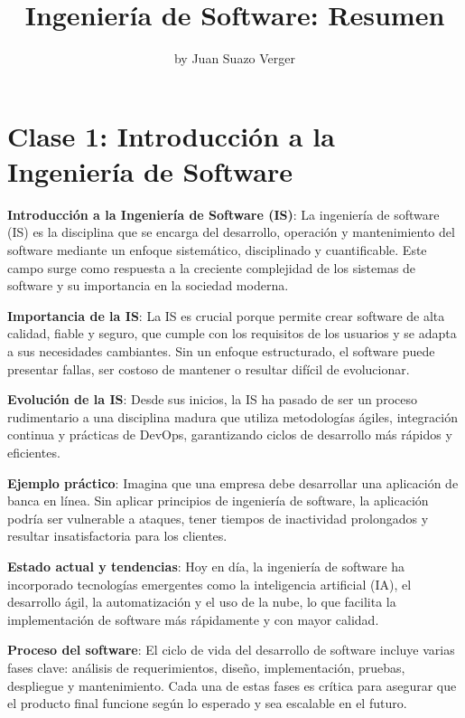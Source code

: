 \documentclass[a4paper,11pt]{article}
\title{Ingeniería de Software: Resumen}
\author{by Juan Suazo Verger}
\date{}
\begin{document}
\maketitle
\thispagestyle{empty}
\newpage

\section*{Clase 1: Introducción a la Ingeniería de Software}

\textbf{Introducción a la Ingeniería de Software (IS)}: La ingeniería de software (IS) es la disciplina que se encarga del desarrollo, operación y mantenimiento del software mediante un enfoque sistemático, disciplinado y cuantificable. Este campo surge como respuesta a la creciente complejidad de los sistemas de software y su importancia en la sociedad moderna.

\textbf{Importancia de la IS}: La IS es crucial porque permite crear software de alta calidad, fiable y seguro, que cumple con los requisitos de los usuarios y se adapta a sus necesidades cambiantes. Sin un enfoque estructurado, el software puede presentar fallas, ser costoso de mantener o resultar difícil de evolucionar.

\textbf{Evolución de la IS}: Desde sus inicios, la IS ha pasado de ser un proceso rudimentario a una disciplina madura que utiliza metodologías ágiles, integración continua y prácticas de DevOps, garantizando ciclos de desarrollo más rápidos y eficientes.

\textbf{Ejemplo práctico}: Imagina que una empresa debe desarrollar una aplicación de banca en línea. Sin aplicar principios de ingeniería de software, la aplicación podría ser vulnerable a ataques, tener tiempos de inactividad prolongados y resultar insatisfactoria para los clientes.

\textbf{Estado actual y tendencias}: Hoy en día, la ingeniería de software ha incorporado tecnologías emergentes como la inteligencia artificial (IA), el desarrollo ágil, la automatización y el uso de la nube, lo que facilita la implementación de software más rápidamente y con mayor calidad.

\textbf{Proceso del software}: El ciclo de vida del desarrollo de software incluye varias fases clave: análisis de requerimientos, diseño, implementación, pruebas, despliegue y mantenimiento. Cada una de estas fases es crítica para asegurar que el producto final funcione según lo esperado y sea escalable en el futuro.
\end{document}
